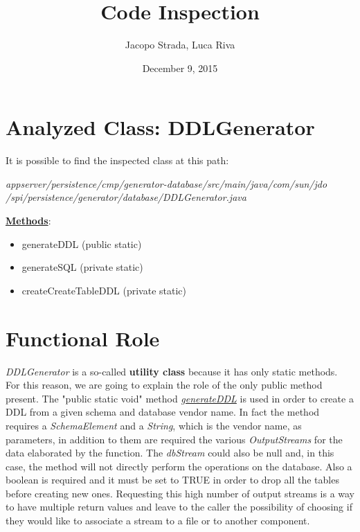 \documentclass[9pt]{beamer}
\title{Code Inspection}
\author{Jacopo Strada, Luca Riva}
\date{December 9, 2015}
\makeatletter
\newcommand*{\currentname}{\@currentlabelname}
\makeatother
\begin{document}
\maketitle

\section{Analyzed Class: DDLGenerator}
\begin{frame}{\currentname}

It is possible to find the inspected class at this path:

\begin{centering}
\textit{appserver/persistence/cmp/generator-database/src/main/java/com/sun/jdo\\/spi/persistence/generator/database/DDLGenerator.java}
\end{centering}

\vfill

\underline{\textbf{Methods}}:

\begin{itemize}
\item generateDDL (public static)
\item generateSQL (private static)
\item createCreateTableDDL (private static)
\end{itemize}

\end{frame}

\section{Functional Role}

\begin{frame}{\currentname}

\textit{DDLGenerator} is a so-called \textbf{utility class} because it has only static methods. For this reason, we are going to explain the role of the only public method present.
\vfill
The "public static void" method \underline{\textit{generateDDL}} is used in order to create a DDL from a given schema and database vendor name. In fact the method requires a \textit{SchemaElement} and a \textit{String}, which is the vendor name, as parameters, in addition to them are required the various \textit{OutputStreams} for the data elaborated by the function. The \textit{dbStream} could also be null and, in this case, the method will not directly perform the operations on the database. Also a boolean is required and it must be set to TRUE in order to drop all the tables before creating new ones.
Requesting this high number of output streams is a way to have multiple return values and leave to the caller the possibility of choosing if they would like to associate a stream to a file or to another component.


\end{frame}
\end{document}
